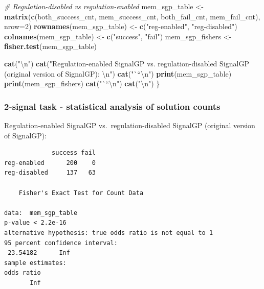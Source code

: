 \documentclass[]{book}
\newenvironment{Shaded}{\begin{snugshade}}{\end{snugshade}}
\newcommand{\CharTok}[1]{\textcolor[rgb]{0.31,0.60,0.02}{#1}}
\newcommand{\CommentTok}[1]{\textcolor[rgb]{0.56,0.35,0.01}{\textit{#1}}}
\newcommand{\DataTypeTok}[1]{\textcolor[rgb]{0.13,0.29,0.53}{#1}}
\newcommand{\DecValTok}[1]{\textcolor[rgb]{0.00,0.00,0.81}{#1}}
\newcommand{\KeywordTok}[1]{\textcolor[rgb]{0.13,0.29,0.53}{\textbf{#1}}}
\newcommand{\NormalTok}[1]{#1}
\newcommand{\StringTok}[1]{\textcolor[rgb]{0.31,0.60,0.02}{#1}}
\begin{document}
\begin{Shaded}
\begin{Highlighting}[]
  \CommentTok{# Regulation-disabled vs regulation-enabled}
\NormalTok{  mem_sgp_table <-}\StringTok{ }\KeywordTok{matrix}\NormalTok{(}\KeywordTok{c}\NormalTok{(both_success_cnt,}
\NormalTok{                            mem_success_cnt,}
\NormalTok{                            both_fail_cnt,}
\NormalTok{                            mem_fail_cnt),}
                          \DataTypeTok{nrow=}\DecValTok{2}\NormalTok{)}
  \KeywordTok{rownames}\NormalTok{(mem_sgp_table) <-}\StringTok{ }\KeywordTok{c}\NormalTok{(}\StringTok{"reg-enabled"}\NormalTok{, }\StringTok{"reg-disabled"}\NormalTok{)}
  \KeywordTok{colnames}\NormalTok{(mem_sgp_table) <-}\StringTok{ }\KeywordTok{c}\NormalTok{(}\StringTok{"success"}\NormalTok{, }\StringTok{"fail"}\NormalTok{)}
\NormalTok{  mem_sgp_fishers <-}\StringTok{ }\KeywordTok{fisher.test}\NormalTok{(mem_sgp_table)}

  \KeywordTok{cat}\NormalTok{(}\StringTok{"}\CharTok{\textbackslash{}n}\StringTok{"}\NormalTok{)}
  \KeywordTok{cat}\NormalTok{(}\StringTok{"Regulation-enabled SignalGP vs. regulation-disabled SignalGP (original version of SignalGP):  }\CharTok{\textbackslash{}n}\StringTok{"}\NormalTok{)}
  \KeywordTok{cat}\NormalTok{(}\StringTok{"```}\CharTok{\textbackslash{}n}\StringTok{"}\NormalTok{)}
  \KeywordTok{print}\NormalTok{(mem_sgp_table)}
  \KeywordTok{print}\NormalTok{(mem_sgp_fishers)}
  \KeywordTok{cat}\NormalTok{(}\StringTok{"```}\CharTok{\textbackslash{}n}\StringTok{"}\NormalTok{)}
  \KeywordTok{cat}\NormalTok{(}\StringTok{"}\CharTok{\textbackslash{}n}\StringTok{"}\NormalTok{)}
\NormalTok{\}}
\end{Highlighting}
\end{Shaded}

\hypertarget{signal-task---statistical-analysis-of-solution-counts}{%
\subsubsection{2-signal task - statistical analysis of solution counts}\label{signal-task---statistical-analysis-of-solution-counts}}

Regulation-enabled SignalGP vs.~regulation-disabled SignalGP (original version of SignalGP):

\begin{verbatim}
             success fail
reg-enabled      200    0
reg-disabled     137   63

    Fisher's Exact Test for Count Data

data:  mem_sgp_table
p-value < 2.2e-16
alternative hypothesis: true odds ratio is not equal to 1
95 percent confidence interval:
 23.54182      Inf
sample estimates:
odds ratio 
       Inf 
\end{verbatim}
\end{document}
